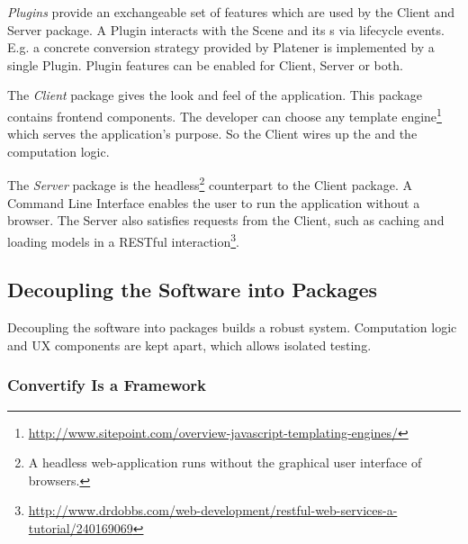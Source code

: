 \documentclass[../ClassicThesis.tex]{subfiles}
\begin{document}
\emph{Plugins} provide an exchangeable set of features which are used by the
Client and Server package. A Plugin interacts with the Scene and its
{\threedmodel}s via lifecycle events. E.g. a concrete conversion strategy
provided by Platener is implemented by a single Plugin. Plugin features can be
enabled for Client, Server or both.

The \emph{Client} package gives the look and feel of the application. This
package contains frontend components. The developer can choose any template
engine\footnote{\url{http://www.sitepoint.com/overview-javascript-templating-engines/}}
which serves the application's purpose. So the Client wires up the
{\userinterface} and the computation logic.

The \emph{Server} package is the headless\footnote{A headless web-application
  runs without the graphical user interface of browsers.} counterpart to the
Client package. A Command Line Interface enables the user to run the application
without a browser. The Server also satisfies requests from the Client, such as
caching and loading models in a RESTful
interaction\footnote{\url{http://www.drdobbs.com/web-development/restful-web-services-a-tutorial/240169069}}.



\subsection{Decoupling the Software into Packages}

Decoupling the software into packages builds a robust system. Computation logic
and UX components are kept apart, which allows isolated testing.

\subsubsection{Convertify Is a Framework}
\end{document}
